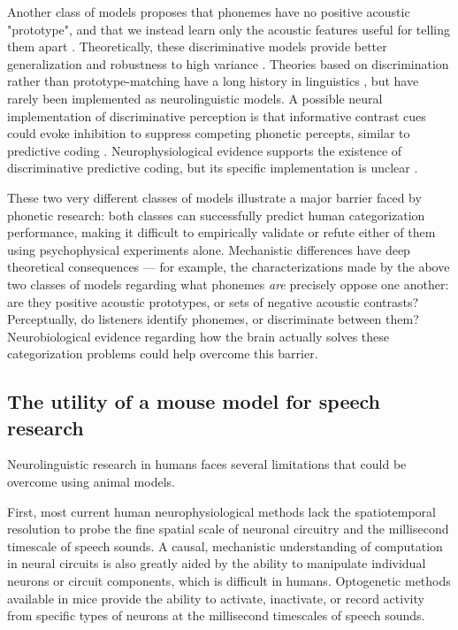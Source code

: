 \documentclass[11pt]{article}\usepackage[]{graphicx}\usepackage[]{color}
\begin{document}
Another class of models proposes that phonemes have no positive acoustic "prototype", and that we instead learn only the acoustic features useful for telling them apart \cite{Kluender2013a}. Theoretically, these discriminative models provide better generalization and robustness to high variance \cite{Ng2002a}. Theories based on discrimination rather than prototype-matching have a long history in linguistics \cite{Saussure1916}, but have rarely been implemented as neurolinguistic models. A possible neural implementation of discriminative perception is that informative contrast cues could evoke inhibition to suppress competing phonetic percepts, similar to predictive coding \cite{Rutishauser2015,Kluender2013a,Dresher2008}. Neurophysiological evidence supports the existence of discriminative predictive coding, but its specific implementation is unclear \cite{Blank2016,Gagnepain2012}.

These two very different classes of models illustrate a major barrier faced by phonetic research: both classes can successfully predict human categorization performance, making it difficult to empirically validate or refute either of them using psychophysical experiments alone. Mechanistic differences have deep theoretical consequences --- for example, the characterizations made by the above two classes of models regarding what phonemes \textit{are} precisely oppose one another: are they positive acoustic prototypes, or sets of negative acoustic contrasts? Perceptually, do listeners identify phonemes, or discriminate between them? Neurobiological evidence regarding how the brain actually solves these categorization problems could help overcome this barrier.

\subsection{The utility of a mouse model for speech research}

Neurolinguistic research in humans faces several limitations that could be overcome using animal models.

First, most current human neurophysiological methods lack the spatiotemporal resolution to probe the fine spatial scale of neuronal circuitry and the millisecond timescale of speech sounds. A causal, mechanistic understanding of computation in neural circuits is also greatly aided by the ability to manipulate individual neurons or circuit components, which is difficult in humans. Optogenetic methods available in mice provide the ability to activate, inactivate, or record activity from specific types of neurons at the millisecond timescales of speech sounds.
\end{document}
